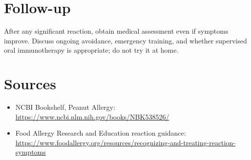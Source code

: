 \section*{Follow-up}
After any significant reaction, obtain medical assessment even if symptoms improve. Discuss ongoing avoidance, emergency training, and whether supervised oral immunotherapy is appropriate; do not try it at home.

\section*{Sources}
\begin{itemize}
\item NCBI Bookshelf, Peanut Allergy: \url{https://www.ncbi.nlm.nih.gov/books/NBK538526/}
\item Food Allergy Research and Education reaction guidance: \url{https://www.foodallergy.org/resources/recognizing-and-treating-reaction-symptoms}
\end{itemize}
